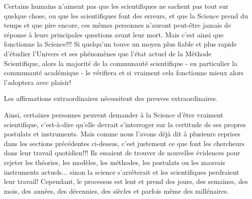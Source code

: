 	Certains humains n'aiment pas que les scientifiques ne sachent pas tout sur quelque chose, ou que les scientifiques font des erreurs, et que la Science prend du temps et que pire encore, ces mêmes personnes n'auront peut-être jamais de réponse à leurs principales questions avant leur mort. Mais c'est ainsi que fonctionne la Science!!! Si quelqu'un touve un moyen plus fiable et plus rapide d'étudier l'Univers et ses phénomènes que l'état actuel de la Méthode Scientifique, alors la majorité de la communauté scientifique - en particulier la communauté académique - le vérifiera et si vraiment cela fonctionne mieux alors l'adoptera avec plaisir!
	
	\begin{fquote}Les affirmations extraordinaires nécessitent des preuves extraordinaires.
 	\end{fquote}
 	
 	Ainsi, certaines personnes peuvent demander à la Science d'être vraiment scientifique, c'est-à-dire qu'elle devrait s'interroger sur la certitude de ses propres postulats et instruments. Mais comme nous l'avons déjà dit à plusieurs reprises dans les sections précédentes ci-dessus, c'est justement ce que font les chercheurs dans leur travail quotidien!!! Ils essaient de trouver de nouvelles évidences pour rejeter les théories, les modèles, les méthodes, les postulats ou les mauvais instruments actuels... sinon la science s'arrêterait et les scientifiques perdraient leur travail! Cependant, le processus est lent et prend des jours, des semaines, des mois, des années, des décennies, des siècles et parfois même des millénaires.
	 
